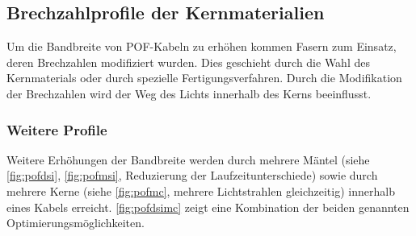 \subsection{Brechzahlprofile der Kernmaterialien}
\label{subsec:pofbrechzahlprofile}

Um die Bandbreite von POF-Kabeln zu erhöhen kommen Fasern zum Einsatz, deren
Brechzahlen modifiziert wurden. Dies geschieht durch die Wahl des Kernmaterials
oder durch spezielle Fertigungsverfahren. Durch die Modifikation der Brechzahlen
wird der Weg des Lichts innerhalb des Kerns beeinflusst.




\subsubsection{Weitere Profile}

Weitere Erhöhungen der Bandbreite werden durch mehrere Mäntel (siehe
\autoref{fig:pofdsi}, \autoref{fig:pofmsi}, Reduzierung der
Laufzeitunterschiede) sowie durch mehrere Kerne (siehe \autoref{fig:pofmc},
mehrere Lichtstrahlen gleichzeitig) innerhalb eines Kabels erreicht.
\autoref{fig:pofdsimc} zeigt eine Kombination der beiden genannten
Optimierungsmöglichkeiten. \cite{pofacprofile}

